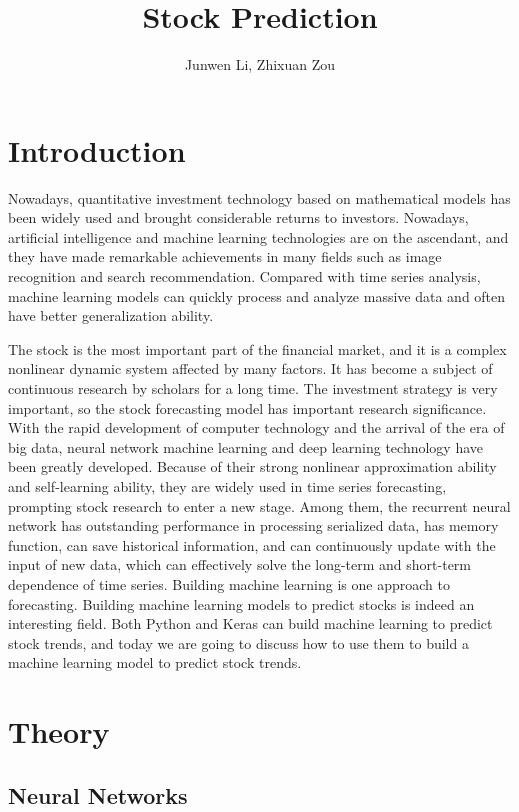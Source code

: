 \documentclass{article}
\title{Stock Prediction}
\author{Junwen Li, Zhixuan Zou}
\begin{document}
\maketitle


\section{Introduction}
Nowadays, quantitative investment technology based on mathematical models has been widely used and brought considerable returns to investors. Nowadays, artificial intelligence and machine learning technologies are on the ascendant, and they have made remarkable achievements in many fields such as image recognition and search recommendation. Compared with time series analysis, machine learning models can quickly process and analyze massive data and often have better generalization ability.

The stock is the most important part of the financial market, and it is a complex nonlinear dynamic system affected by many factors. It has become a subject of continuous research by scholars for a long time. The investment strategy is very important, so the stock forecasting model has important research significance. With the rapid development of computer technology and the arrival of the era of big data, neural network machine learning and deep learning technology have been greatly developed. Because of their strong nonlinear approximation ability and self-learning ability, they are widely used in time series forecasting, prompting stock research to enter a new stage. Among them, the recurrent neural network has outstanding performance in processing serialized data, has memory function, can save historical information, and can continuously update with the input of new data, which can effectively solve the long-term and short-term dependence of time series. Building machine learning is one approach to forecasting. Building machine learning models to predict stocks is indeed an interesting field. Both Python and Keras can build machine learning to predict stock trends, and today we are going to discuss how to use them to build a machine learning model to predict stock trends.

\section{Theory}

\subsection{Neural Networks}
\end{document}
